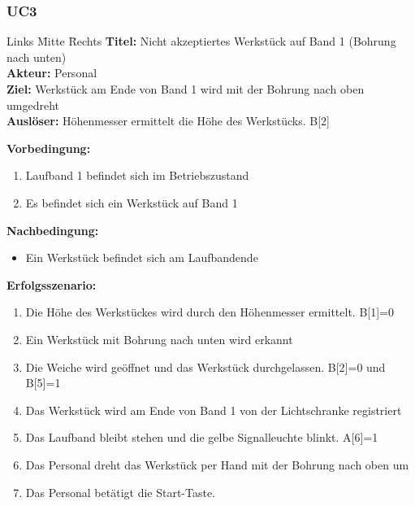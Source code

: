 \documentclass[oneside,a4paper,titlepage]{scrartcl} %
\begin{document}
\subsubsection{UC3}
\begin{tabbing}
 Links \= Mitte \= Rechts \kill
 \textbf{Titel:} \> \> Nicht akzeptiertes Werkstück auf Band 1 (Bohrung nach unten)\\
 \textbf{Akteur:} \> \> Personal\\
 \textbf{Ziel:} \> \> Werkstück am Ende von Band 1 wird mit der Bohrung nach oben umgedreht\\
 \textbf{Auslöser:} \> \> Höhenmesser ermittelt die Höhe des Werkstücks. B[2]\\
\end{tabbing}
\textbf{Vorbedingung:}
\begin{enumerate}
 \item Laufband 1 befindet sich im Betriebszustand
 \item Es befindet sich ein Werkstück auf Band 1
\end{enumerate}
\textbf{Nachbedingung:}
\begin{itemize}
 \item Ein Werkstück befindet sich am Laufbandende
\end{itemize}
\textbf{Erfolgsszenario:}
\begin{enumerate}
 \item Die Höhe des Werkstückes wird durch den Höhenmesser ermittelt. B[1]=0
 \item Ein Werkstück mit Bohrung nach unten wird erkannt
 \item Die Weiche wird geöffnet und das Werkstück durchgelassen. B[2]=0 und B[5]=1
 \item Das Werkstück wird am Ende von Band 1 von der Lichtschranke registriert
 \item Das Laufband bleibt stehen und die gelbe Signalleuchte blinkt. A[6]=1
 \item Das Personal dreht das Werkstück per Hand mit der Bohrung nach oben um
 \item Das Personal betätigt die Start-Taste.
\end{enumerate}
\end{document}
